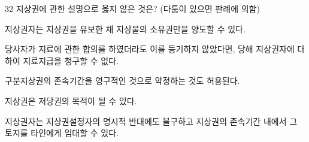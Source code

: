 \begin{question}{32}
지상권에 관한 설명으로 옳지 않은 것은? (다툼이 있으면 판례에 의함)
\begin{choices}
  \item 지상권자는 지상권을 유보한 채 지상물의 소유권만을 양도할 수 있다.
  \item 당사자가 지료에 관한 합의를 하였더라도 이를 등기하지 않았다면, 당해 지상권자에 대하여 지료지급을 청구할 수 없다.
  \item 구분지상권의 존속기간을 영구적인 것으로 약정하는 것도 허용된다.
  \item 지상권은 저당권의 목적이 될 수 있다.
  \item 지상권자는 지상권설정자의 명시적 반대에도 불구하고 지상권의 존속기간 내에서 그 토지를 타인에게 임대할 수 있다.
\end{choices}
\end{question}
